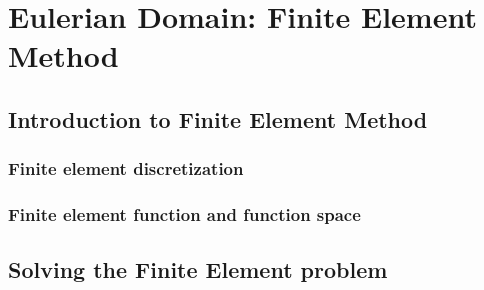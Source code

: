 \chapter{Eulerian Domain: Finite Element Method}

%


\section{Introduction to Finite Element Method}


\subsection{Finite element discretization}


\subsection{Finite element function and function space}


\section{Solving the Finite Element problem}

